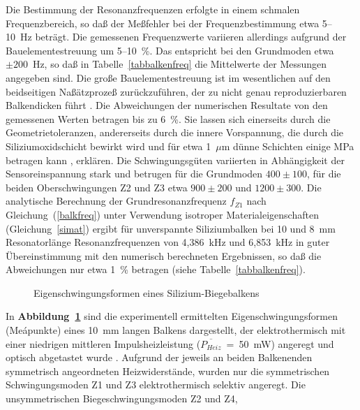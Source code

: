 Die Bestimmung der Resonanzfrequenzen erfolgte in einem
schmalen Frequenzbereich, so daß der Meßfehler bei der Frequenzbestimmung
etwa 5--10~Hz beträgt. Die gemessenen Frequenzwerte variieren
allerdings aufgrund der Bauelementestreuung um 5--10~\%. Das entspricht
bei den Grundmoden etwa $\pm200$~Hz, so daß
in Tabelle~\ref{tabbalkenfreq} die Mittelwerte der Messungen angegeben sind.
Die große Bauelementestreuung ist im wesentlichen auf den beidseitigen
Naßätzprozeß zurückzuführen, der zu nicht genau reproduzierbaren
Balkendicken führt \cite{ABV93}. Die Abweichungen der numerischen
Resultate von den gemessenen Werten betragen bis zu 6~\%. Sie lassen sich
einerseits durch die Geometrietoleranzen, andererseits durch die innere
Vorspannung, die durch die Siliziumoxidschicht bewirkt wird und für
etwa 1~$\mu$m dünne Schichten einige MPa betragen kann \cite{Mur92},
erklären. Die Schwingungsgüten variierten in Abhängigkeit der
Sensoreinspannung stark und betrugen für die Grundmoden $400\pm100$, für die
beiden Oberschwingungen Z2 und Z3 etwa $900\pm200$ und $1200\pm300$.
Die analytische Berechnung der Grundresonanzfrequenz $f_{Z1}$
nach Gleichung~(\ref{balkfreq}) unter Verwendung isotroper
Materialeigenschaften (Gleichung~\ref{simat}) ergibt für
unverspannte Siliziumbalken bei 10 und 8~mm Resonatorlänge
Resonanzfrequenzen von 4,386~kHz und 6,853~kHz in guter Übereinstimmung
mit den numerisch berechneten Ergebnissen, so daß die Abweichungen nur etwa
1~\% betragen (siehe Tabelle~\ref{tabbalkenfreq}).
\begin{figure}[htb]
\begin{center}

\setabbvda
\end{center}
\caption{\label{abbbalkenmoden}
 Eigenschwingungsformen eines Silizium-Biegebalkens}
\end{figure}
In {\bf Abbildung~\ref{abbbalkenmoden}} sind die experimentell ermittelten
Eigenschwingungsformen (Meápunkte) eines 10~mm langen Balkens dargestellt,
der elektrothermisch mit einer niedrigen mittleren Impulsheizleistung
($\overline{P_{Heiz}}$~=~50~mW) angeregt und optisch abgetastet
wurde \cite{Mue92}. Aufgrund der jeweils an beiden Balkenenden symmetrisch
angeordneten Heizwiderstände, wurden nur die symmetrischen Schwingungsmoden
Z1 und Z3 elektrothermisch selektiv angeregt. Die unsymmetrischen
Biegeschwingungsmoden Z2 und Z4,
